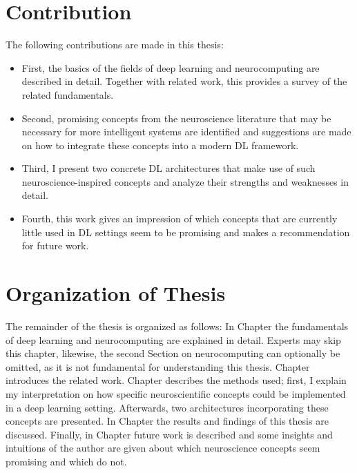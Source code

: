 

\section{Contribution}
The following contributions are made in this thesis:
\begin{itemize}
	\item First, the basics of the fields of deep learning and neurocomputing are described in detail. Together with related work, this provides a survey of the related fundamentals.
	\item Second, promising concepts from the neuroscience literature that may be necessary for more intelligent systems are identified and suggestions are made on how to integrate these concepts into a modern DL framework.
	\item Third, I present two concrete DL architectures that make use of such neuroscience-inspired concepts and analyze their strengths and weaknesses in detail.
	\item Fourth, this work gives an impression of which concepts that are currently little used in DL settings seem to be promising and makes a recommendation for future work.
\end{itemize}

\section{Organization of Thesis}
The remainder of the thesis is organized as follows: In Chapter  the fundamentals of deep learning and neurocomputing are explained in detail.
Experts may skip this chapter, likewise, the second Section on neurocomputing can optionally be omitted, as it is not fundamental for understanding this thesis.
Chapter  introduces the related work. Chapter  describes the methods used; first, I explain my interpretation on how specific neuroscientific concepts could be implemented in a deep learning setting. Afterwards, two architectures incorporating these concepts are presented. In Chapter  the results and findings of this thesis are discussed. Finally, in Chapter  future work is described and some insights and intuitions of the author are given about which neuroscience concepts seem promising and which do not.


